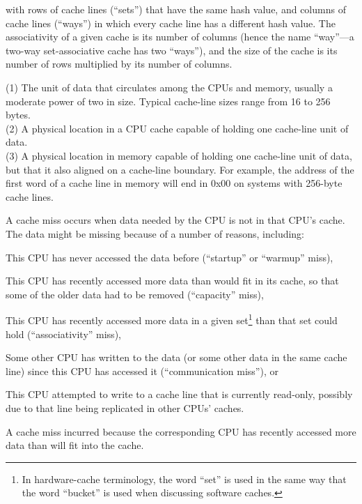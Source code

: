\begin{description}
	with rows of cache lines (``sets'') that have the same hash
	value, and columns of cache lines (``ways'') in which every
	cache line has a different hash value.
	The associativity of a given cache is its number of
	columns (hence the name ``way''---a two-way set-associative
	cache has two ``ways''), and the size of the cache is its
	number of rows multiplied by its number of columns.
\item[\IXG{Cache Line}:]
	(1) The unit of data that circulates among the CPUs and memory,
	usually a moderate power of two in size.
	Typical cache-line sizes range from 16 to 256 bytes. \\
	(2) A physical location in a CPU cache capable of holding
	one cache-line unit of data. \\
	(3) A physical location in memory capable of holding one
	cache-line unit of data, but that it also aligned
	on a cache-line boundary.
	For example, the address of the first word of a cache line
	in memory will end in 0x00 on systems with 256-byte cache lines.
\item[\IXG{Cache Miss}:]
	A cache miss occurs when data needed by the CPU is not in
	that CPU's cache.
	The data might be missing because of a number of reasons,
	including:
	\begin{enumerate*}[(1)]
	\item This CPU has never accessed the data before
	(``startup'' or ``warmup'' miss),
	\item This CPU has recently accessed more
	data than would fit in its cache, so that some of the older
	data had to be removed (``capacity'' miss),
	\item This CPU
	has recently accessed more data in a given set\footnote{
		In hardware-cache terminology, the word ``set''
		is used in the same way that the word ``bucket''
		is used when discussing software caches.}
	than that set could hold (``associativity'' miss),
	\item Some other CPU has written to the data (or some other
	data in the same cache line) since this CPU has accessed it
	(``communication miss''), or
	\item This CPU attempted to write to a cache line that is
	currently read-only, possibly due to that line being replicated
	in other CPUs' caches.
	\end{enumerate*}
\item[\IXGalth{Capacity Miss}{capacity}{cache miss}:]
	A cache miss incurred because the corresponding CPU has recently
	accessed more data than will fit into the cache.

\end{description}
